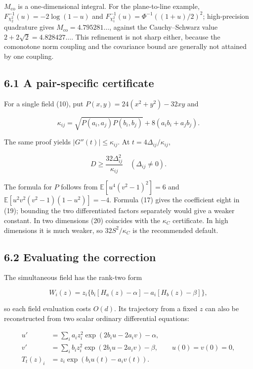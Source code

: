 \documentclass[
  british,
  11pt,
  a4paper,
]{article}
\begin{document}
\(M_{\mathrm{co}}\) is a one-dimensional integral. For the plane-to-line
example, \(F^{-1}_{\chi^2_2}(u)=-2\log(1-u)\) and
\(F^{-1}_{\chi^2_1}(u)=\Phi^{-1}((1+u)/2)^2\); high-precision quadrature
gives \(M_{\mathrm{co}}=4.795281\ldots\), against the Cauchy--Schwarz
value \(2+2\sqrt2=4.828427\ldots\). This refinement is not sharp either,
because the comonotone norm coupling and the covariance bound are
generally not attained by one coupling.

\subsection{6.1 A pair-specific
certificate}\label{a-pair-specific-certificate}

For a single field (10), put \(P(x,y)=24(x^2+y^2)-32xy\) and

\[
\kappa_{ij}=\sqrt{P(a_i,a_j)P(b_i,b_j)}+8(a_ib_i+a_jb_j).              \tag{19}
\]

The same proof yields \(|G''(t)|\leq\kappa_{ij}\). At
\(t=4\Delta_{ij}/\kappa_{ij}\),

\[
D\geq\frac{32\Delta_{ij}^2}{\kappa_{ij}}\quad(\Delta_{ij}\ne0).       \tag{20}
\]

The formula for \(P\) follows from \(\mathbb E[u^4(v^2-1)^2]=6\) and
\(\mathbb E[u^2v^2(v^2-1)(1-u^2)]=-4\). Formula (17) gives the
coefficient eight in (19); bounding the two differentiated factors
separately would give a weaker constant. In two dimensions (20)
coincides with the \(\kappa_C\) certificate. In high dimensions it is
much weaker, so \(32S^2/\kappa_C\) is the recommended default.

\subsection{6.2 Evaluating the
correction}\label{evaluating-the-correction}

The simultaneous field has the rank-two form

\[
W_i(z)=z_i\{b_i[H_a(z)-\alpha]-a_i[H_b(z)-\beta]\},
\]

so each field evaluation costs \(O(d)\). Its trajectory from a fixed
\(z\) can also be reconstructed from two scalar ordinary differential
equations:

\[
\begin{aligned}
u'&=\sum_i a_i z_i^2\exp(2b_i u-2a_i v)-\alpha,\\
v'&=\sum_i b_i z_i^2\exp(2b_i u-2a_i v)-\beta,
\qquad u(0)=v(0)=0,\\
T_t(z)_i&=z_i\exp(b_i u(t)-a_i v(t)).
\end{aligned}
\]
\end{document}
